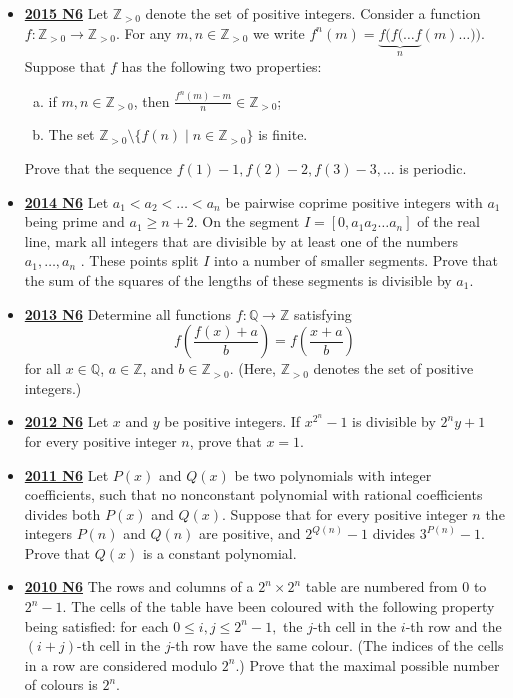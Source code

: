 \documentclass[11pt]{scrartcl}
\begin{document}
\begin{itemize}[leftmargin=*]
\item \href{https://artofproblemsolving.com/community/c6h1268916p6622847}{\textbf{2015 N6}} Let $\mathbb{Z}_{>0}$ denote the set of positive integers. Consider a function $f: \mathbb{Z}_{>0} \to \mathbb{Z}_{>0}$. For any $m, n \in \mathbb{Z}_{>0}$ we write $f^n(m) = \underbrace{f(f(\dots f}_{n}(m)\dots))$. Suppose that $f$ has the following two properties:
\begin{enumerate}[(a)]
\item if $m, n \in \mathbb{Z}_{>0}$, then $\frac{f^n(m) - m}{n} \in \mathbb{Z}_{>0}$;
\item The set $\mathbb{Z}_{>0} \setminus \{f(n) \mid n\in \mathbb{Z}_{>0}\}$ is finite.
\end{enumerate}
Prove that the sequence $f(1) - 1, f(2) - 2, f(3) - 3, \dots$ is periodic.
\item \href{https://artofproblemsolving.com/community/c6h1113200p5083572}{\textbf{2014 N6}} Let $a_1 < a_2 <  \dots <a_n$ be pairwise coprime positive integers with $a_1$ being prime and $a_1 \geqslant  n + 2$. On the segment $I = [0, a_1 a_2  \dots a_n ]$ of the real line, mark all integers that are divisible by at least one of the numbers $a_1 ,   \dots , a_n$ . These points split $I$ into a number of smaller segments. Prove that the sum of the squares of the lengths of these segments is divisible by $a_1$.
\item \href{https://artofproblemsolving.com/community/c6h597248p3544109}{\textbf{2013 N6}} Determine all functions $f: \mathbb{Q} \rightarrow \mathbb{Z} $ satisfying
\[ f \left( \frac{f(x)+a} {b}\right) = f \left( \frac{x+a}{b} \right) \]
for all $x \in \mathbb{Q}$, $a \in \mathbb{Z}$, and $b \in \mathbb{Z}_{>0}$. (Here, $\mathbb{Z}_{>0}$ denotes the set of positive integers.)
\item \href{https://artofproblemsolving.com/community/c6h545765p3156844}{\textbf{2012 N6}} Let $x$ and $y$ be positive integers. If ${x^{2^n}}-1$ is divisible by $2^ny+1$ for every positive integer $n$, prove that $x=1$.
\item \href{https://artofproblemsolving.com/community/c6h488543p2737654}{\textbf{2011 N6}} Let $P(x)$ and $Q(x)$ be two polynomials with integer coefficients, such that no nonconstant polynomial with rational coefficients divides both $P(x)$ and $Q(x).$ Suppose that for every positive integer $n$ the integers $P(n)$ and $Q(n)$ are positive, and $2^{Q(n)}-1$ divides $3^{P(n)}-1.$ Prove that $Q(x)$ is a constant polynomial.
\item \href{https://artofproblemsolving.com/community/c6h418643p2362013}{\textbf{2010 N6}} The rows and columns of a $2^n \times 2^n$ table are numbered from $0$ to $2^{n}-1.$ The cells of the table have been coloured with the following property being satisfied: for each $0 \leqslant i,j \leqslant 2^n - 1,$ the $j$-th cell in the $i$-th row and the $(i+j)$-th cell in the $j$-th row have the same colour. (The indices of the cells in a row are considered modulo $2^n$.) Prove that the maximal possible number of colours is $2^n$.

\end{itemize}
\end{document}
